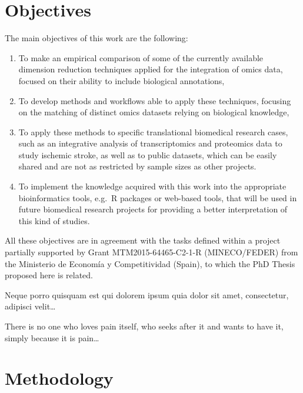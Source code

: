 \documentclass[a4paper, nobind]{templates/ociamthesis}
\renewcommand{\chaptermark}[1]{\markboth{\thechapter. #1}{\thechapter. #1}}
\begin{document}
\hypertarget{objectives}{%
\chapter{Objectives}\label{objectives}}

\chaptermark{Objectives}

\noindent The main objectives of this work are the following:

\begin{enumerate}
\def\labelenumi{\arabic{enumi}.}
\item
  To make an empirical comparison of some of the currently available dimension reduction techniques applied for the integration of omics data, focused on their ability to include biological annotations,
\item
  To develop methods and workflows able to apply these techniques, focusing on the matching of distinct omics datasets relying on biological knowledge,
\item
  To apply these methods to specific translational biomedical research cases, such as an integrative analysis of transcriptomics and proteomics data to study ischemic stroke, as well as to public datasets, which can be easily shared and are not as restricted by sample sizes as other projects.
\item
  To implement the knowledge acquired with this work into the appropriate bioinformatics tools, e.g.~R packages or web-based tools, that will be used in future biomedical research projects for providing a better interpretation of this kind of studies.
\end{enumerate}

All these objectives are in agreement with the tasks defined within a project partially supported by Grant MTM2015-64465-C2-1-R (MINECO/FEDER) from the Ministerio de Economía y Competitividad (Spain), to which the PhD Thesis proposed here is related.

\begin{savequote}
Neque porro quisquam est qui dolorem ipsum quia dolor sit amet,
consectetur, adipisci velit\ldots{}

There is no one who loves pain itself, who seeks after it and wants to
have it, simply because it is pain\ldots{}
\end{savequote}



\hypertarget{methods}{%
\chapter{Methodology}\label{methods}}
\end{document}
